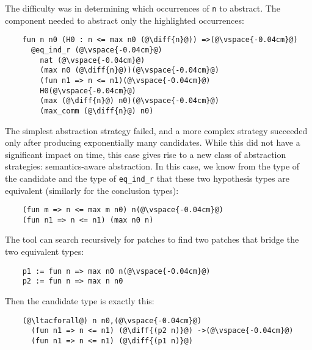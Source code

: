 The difficulty was in determining which occurrences of \lstinline{n} to abstract.
The component needed to abstract only the highlighted occurrences:

\begin{lstlisting}
    fun n n0 (H0 : n <= max n0 (@\diff{n}@)) =>(@\vspace{-0.04cm}@)
      @eq_ind_r (@\vspace{-0.04cm}@)
        nat (@\vspace{-0.04cm}@)
        (max n0 (@\diff{n}@))(@\vspace{-0.04cm}@)
        (fun n1 => n <= n1)(@\vspace{-0.04cm}@)
        H0(@\vspace{-0.04cm}@)
        (max (@\diff{n}@) n0)(@\vspace{-0.04cm}@)
        (max_comm (@\diff{n}@) n0)
\end{lstlisting}

The simplest abstraction strategy failed, and a more
complex strategy
succeeded only after producing exponentially many candidates.
While this did not have a significant impact on time,
this case gives rise to a new class of abstraction strategies:
semantics-aware abstraction.
In this case, we know from the type of the candidate
and the type of \lstinline{eq_ind_r} that these two hypothesis types 
are equivalent (similarly for the conclusion types):

\begin{lstlisting}
    (fun m => n <= max m n0) n(@\vspace{-0.04cm}@)
    (fun n1 => n <= n1) (max n0 n)
\end{lstlisting}

The tool can search recursively for patches to find two patches that bridge the two equivalent
types:

\begin{lstlisting}
    p1 := fun n => max n0 n(@\vspace{-0.04cm}@)
    p2 := fun n => max n n0
\end{lstlisting}

Then the candidate type is exactly this:

\begin{lstlisting}
    (@\ltacforall@) n n0,(@\vspace{-0.04cm}@)
      (fun n1 => n <= n1) (@\diff{(p2 n)}@) ->(@\vspace{-0.04cm}@)
      (fun n1 => n <= n1) (@\diff{(p1 n)}@)
\end{lstlisting}

